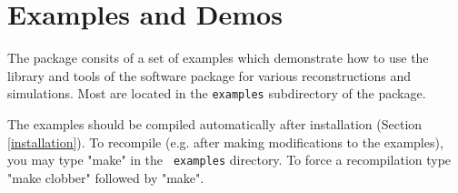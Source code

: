 \documentclass[]{cxs-software}
\begin{document}
\newpage

\section{Examples and Demos}

The package consits of a set of examples which demonstrate how to use
the library and tools of the software package for various
reconstructions and simulations. Most are located in the {\tt examples}
subdirectory of the package.

The examples should be compiled automatically after installation
(Section \ref{installation}). To recompile (e.g.  after making
modifications to the examples), you may type "make" in the {\tt
  examples} directory.  To force a recompilation type "make clobber"
followed by "make".
\end{document}
